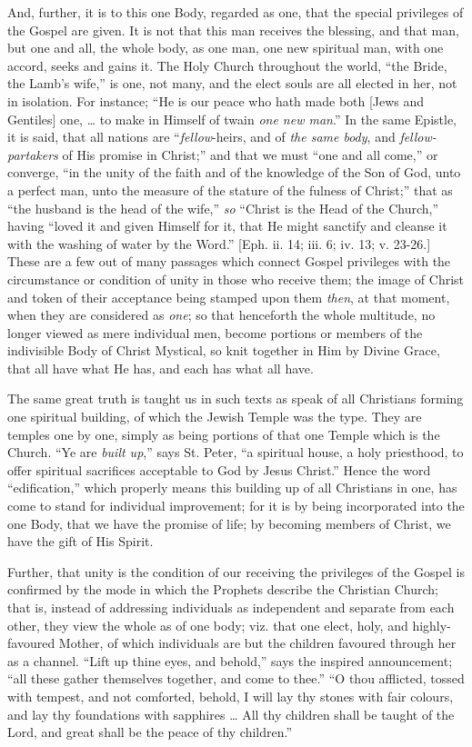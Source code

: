 And, further, it is to this one Body, regarded as one, that the
special privileges of the Gospel are given. It is not that this man
receives the blessing, and that man, but one and all, the whole body,
as one man, one new spiritual man, with one accord, seeks and gains
it. The Holy Church throughout the world, ``the Bride, the Lamb's
wife,'' is one, not many, and the elect souls are all elected in
her, not in isolation. For instance; ``He is our peace who hath
made both [Jews and Gentiles] one, … to make in Himself of twain \emph{one
new man}.'' In the same Epistle, it is said, that all nations
are ``\emph{fellow}-heirs, and of \emph{the same body}, and \emph{fellow-partakers}
of His promise in Christ;'' and that we must ``one and all
come,'' or converge, ``in the unity of the faith and of the
knowledge of the Son of God, unto a perfect man, unto the measure of
the stature of the fulness of Christ;'' that as ``the husband
is the head of the wife,'' \emph{so} ``Christ is the Head of
the Church,'' having ``loved it and given Himself for it, that
He might sanctify and cleanse it with the washing of water by the
Word.'' [Eph. ii. 14; iii. 6; iv. 13; v. 23-26.] These are a few
out of many passages which connect Gospel privileges with the
circumstance or condition of unity in those who receive them; the
image of Christ and token of their acceptance being stamped upon them \emph{then},
at that moment, when they are considered as \emph{one}; so that
henceforth the whole multitude, no longer viewed as mere individual
men, become portions or members of the indivisible Body of Christ
Mystical, so knit together in Him by Divine Grace, that all have what
He has, and each has what all have.

The same great truth is taught us in such texts as speak of all
Christians forming one spiritual building, of which the Jewish Temple
was the type. They are temples one by one, simply as being portions of
that one Temple which is the Church. ``Ye are \emph{built up},''
says St. Peter, ``a spiritual house, a holy priesthood, to offer
spiritual sacrifices acceptable to God by Jesus Christ.'' Hence
the word ``edification,'' which properly means this building
up of all Christians in one, has come to stand for individual
improvement; for it is by being incorporated into the one Body, that
we have the promise of life; by becoming members of Christ, we have
the gift of His Spirit.

Further, that unity is the condition of our receiving the
privileges of the Gospel is confirmed by the mode in which the
Prophets describe the Christian Church; that is, instead of addressing
individuals as independent and separate from each other, they view the
whole as of one body; viz. that one elect, holy, and highly-favoured
Mother, of which individuals are but the children favoured through her
as a channel. ``Lift up thine eyes, and behold,'' says the
inspired announcement; ``all these gather themselves together, and
come to thee.'' ``O thou afflicted, tossed with tempest, and
not comforted, behold, I will lay thy stones with fair colours, and
lay thy foundations with sapphires … All thy children shall be
taught of the Lord, and great shall be the peace of thy
children.''

